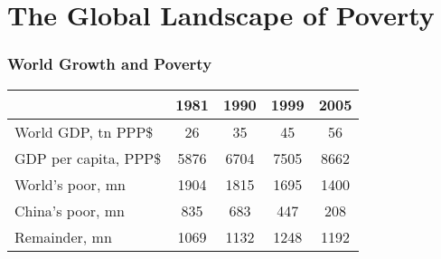 \section{The Global Landscape of Poverty}


{ %
    \begin{frame}[plain]
     \btVFill
        \hspace{-0.9cm}\noindent{\linespread{0.5}\selectfont
        \textcolor{black}{\tiny
        Source: Wall Street Journal 2005
        }
        \par
        }
     \end{frame}
}

\begin{frame}\frametitle{World Growth and Poverty}

\begin{table}
\begin{tabularx}{0.9\textwidth}{l c c c c}
\firsthline
&1981&1990&1999&2005\\
\hline
World GDP, tn PPP\$&26&35&45&56\\
GDP per capita, PPP\$&5876&6704&7505&8662\\
World's poor, mn&1904&1815&1695&1400\\
China's poor, mn&835&683&447&208\\
Remainder, mn&1069&1132&1248&1192\\
\hline
\end{tabularx}
\end{table}
\end{frame}

